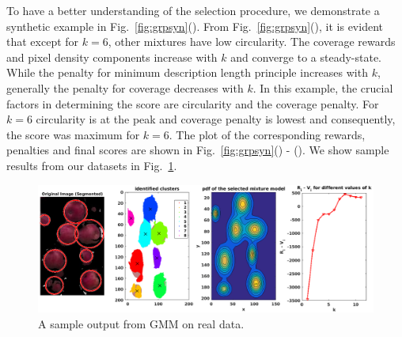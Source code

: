 To have a better understanding of the selection procedure, we demonstrate a synthetic example in Fig.~\ref{fig:grpsyn}(). From Fig.~\ref{fig:grpsyn}(), it is evident that except for $k =6$, other mixtures have low circularity. The coverage rewards and pixel density components increase with $k$ and converge to a steady-state. While the penalty for minimum description length principle increases with $k$, generally the penalty for coverage decreases with $k$. In this example, the crucial factors in determining the score are circularity and the coverage penalty. For $k = 6$ circularity is at the peak and coverage penalty is lowest and consequently, the score was maximum for $k = 6$. The plot of the corresponding rewards, penalties and final scores are shown in Fig.~\ref{fig:grpsyn}() - (). We show sample results from our datasets in Fig.~\ref{fig:grpcongmm}. 

\begin{figure}[!hbpt]

        \centering        
            \includegraphics[width=\textwidth]{figures/counting/applejournalcountreal.png}           
        
   \label{fig:gmmex}  
  \caption[Fruit counting on real data using unsupervised clustering.]{A sample output from GMM on real data.}
   \label{fig:grpcongmm}
\end{figure}    

